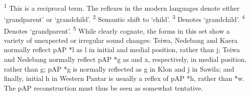 \raggedright

\textsuperscript{1} This is a reciprocal term. The reflexes in the modern languages denote either `grandparent' or `grandchild'.  \textsuperscript{2} Semantic shift to `child'.  \textsuperscript{3} Denotes `grandchild'.  \textsuperscript{4} Denotes `grandparent'.  \textsuperscript{5} While clearly cognate, the forms in this set show a variety of unexpected or irregular sound changes: Teiwa, Nedebang and Kaera normally reflect pAP *l as l in initial and medial position, rather than j; Teiwa and Nedebang normally reflect pAP *g as {\pharfric} and x, respectively, in medial position, rather than g; pAP *g is normally reflected as g in Klon and j in Sawila; and finally, initial h in Western Pantar is usually a reflex of pAP *h, rather than *w. The pAP reconstruction must thus be seen as somewhat tentative.






